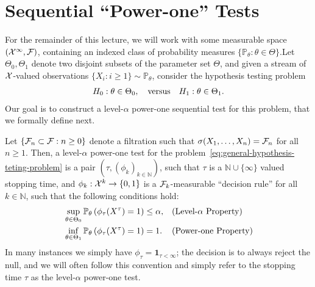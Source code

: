 \documentclass[12pt]{article}
\begin{document}
\section{Sequential ``Power-one'' Tests}
For the remainder of this lecture, we will work with some measurable space $({\cal X}^\infty, {\cal F})$, containing an indexed class of probability measures $\{\mathbb{P}_\theta: \theta \in \Theta\}$.Let $\Theta_0, \Theta_1$ denote two disjoint subsets of the parameter set $\Theta$, and given a stream of ${\cal X}$-valued observations  $\{X_i: i \geq 1\} \sim \mathbb{P}_{\theta}$, consider the hypothesis testing problem 
\begin{align}
    H_0: \theta \in \Theta_0, \quad \text{versus} \quad H_1: \theta \in \Theta_1. \label{eq:general-hypothesis-teting-problem}
\end{align}
Our goal is to construct a level-$\alpha$ power-one sequential test for this problem, that we formally define next. 
\begin{definition}
\label{def:power-one-test}  Let $\{{\cal F}_n \subset {\cal F}: n \geq 0\}$ denote a filtration such that $\sigma(X_1,\ldots, X_n) = {\cal F}_n$ for all $n \geq 1$. Then, a level-$\alpha$ power-one test for the problem~\eqref{eq:general-hypothesis-teting-problem} is a pair $(\tau, (\phi_k)_{k \in \mathbb{N}})$, such that $\tau$ is a $\mathbb{N} \cup \{\infty\}$ valued stopping time, and $\phi_k:{\cal X}^k \to \{0,1\}$ is a ${\cal F}_k$-measurable ``decision rule'' for all $k \in \mathbb{N}$, such that the following conditions hold: 
\begin{align}
    &\sup_{\theta \in \Theta_0}\mathbb{P}_{\theta}\left( \phi_{\tau}(X^\tau) = 1 \right)  \leq \alpha, && (\text{Level-$\alpha$ Property}) \\
    &\inf_{\theta \in \Theta_1}\mathbb{P}_{\theta}\left( \phi_{\tau}(X^\tau) = 1 \right)  = 1. && (\text{Power-one Property})
\end{align}
In many instances we simply have $\phi_\tau = \boldsymbol{1}_{\tau < \infty}$; the decision is to always reject the null, and we will often follow this convention and simply refer to the stopping time $\tau$ as the level-$\alpha$ power-one test.  
\end{definition}
\end{document}
